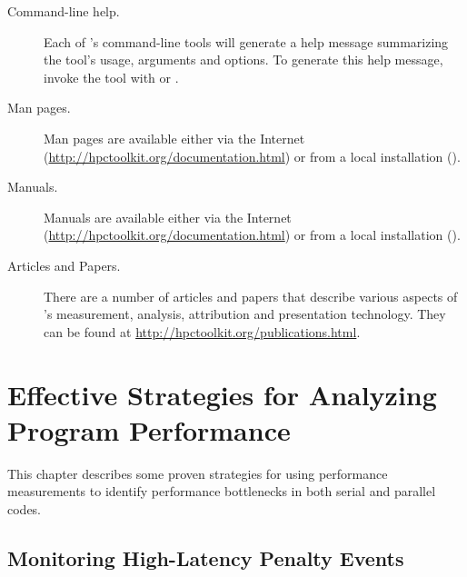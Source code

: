 \documentclass[11pt,letterpaper]{report}
\begin{document}
\begin{description}

\item[Command-line help.]\hfill

Each of \HPCToolkit{}'s command-line tools will generate a help message summarizing the tool's usage, arguments and options.
To generate this help message, invoke the tool with  or .

\item[Man pages.]\hfill

Man pages are available either via the Internet (\url{http://hpctoolkit.org/documentation.html}) or from a local \HPCToolkit{} installation ().

\item[Manuals.]\hfill

Manuals are available either via the Internet (\url{http://hpctoolkit.org/documentation.html}) or from a local \HPCToolkit{} installation ().

\item[Articles and Papers.]\hfill

There are a number of articles and papers that describe various aspects of \HPCToolkit{}'s measurement, analysis, attribution and presentation technology.
They can be found at \url{http://hpctoolkit.org/publications.html}.

\end{description}



\chapter{Effective Strategies for Analyzing Program Performance}
\label{chpt:effective-performance-analysis}

This chapter describes some proven strategies for using performance measurements to identify performance bottlenecks in both serial and parallel codes.



\section{Monitoring High-Latency Penalty Events}
\label{sec:effective-performance-analysis:penalty-events}
\end{document}
